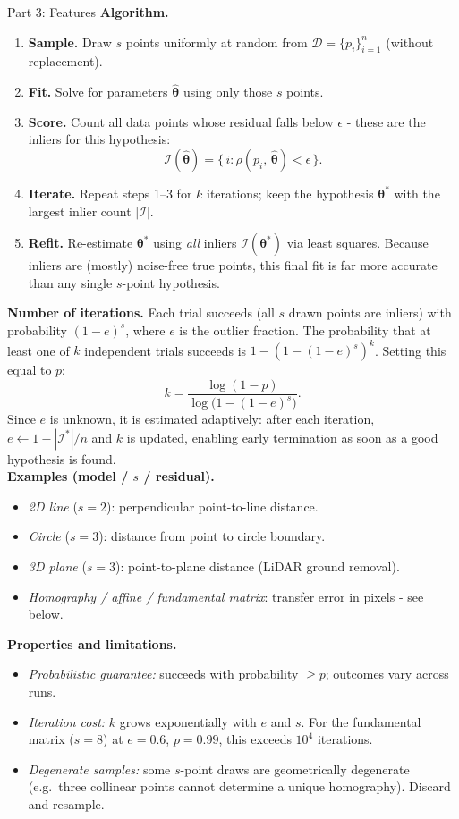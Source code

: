 \documentclass[letterpaper]{article}
\begin{document}
\begin{notes}{Part 3: Features}
\textbf{Algorithm.}
\begin{enumerate}
    \item \textbf{Sample.} Draw $s$ points uniformly at random from $\mathcal{D} = \{p_i\}_{i=1}^n$ (without replacement).
    \item \textbf{Fit.} Solve for parameters $\hat{\boldsymbol{\theta}}$ using only those $s$ points.
    \item \textbf{Score.} Count all data points whose residual falls below $\epsilon$ - these are the inliers for this hypothesis:
    $$\mathcal{I}(\hat{\boldsymbol{\theta}}) = \bigl\{\,i : \rho(p_i,\,\hat{\boldsymbol{\theta}}) < \epsilon\,\bigr\}.$$
    \item \textbf{Iterate.} Repeat steps 1–3 for $k$ iterations; keep the hypothesis $\boldsymbol{\theta}^*$ with the largest inlier count $|\mathcal{I}|$.
    \item \textbf{Refit.} Re-estimate $\boldsymbol{\theta}^*$ using \emph{all} inliers $\mathcal{I}(\boldsymbol{\theta}^*)$ via least squares. Because inliers are (mostly) noise-free true points, this final fit is far more accurate than any single $s$-point hypothesis.
\end{enumerate}

\textbf{Number of iterations.} Each trial succeeds (all $s$ drawn points are inliers) with probability $(1-e)^s$, where $e$ is the outlier fraction. The probability that at least one of $k$ independent trials succeeds is $1-(1-(1-e)^s)^k$. Setting this equal to $p$:
$$k = \frac{\log(1-p)}{\log\bigl(1-(1-e)^s\bigr)}.$$
Since $e$ is unknown, it is estimated adaptively: after each iteration, $e \leftarrow 1 - |\mathcal{I}^*|/n$ and $k$ is updated, enabling early termination as soon as a good hypothesis is found.\\

\textbf{Examples (model / $s$ / residual).}
\begin{itemize}
    \item \emph{2D line} ($s=2$): perpendicular point-to-line distance.
    \item \emph{Circle} ($s=3$): distance from point to circle boundary.
    \item \emph{3D plane} ($s=3$): point-to-plane distance (LiDAR ground removal).
    \item \emph{Homography / affine / fundamental matrix}: transfer error in pixels - see below.
\end{itemize}

\textbf{Properties and limitations.}
\begin{itemize}
    \item \emph{Probabilistic guarantee:} succeeds with probability $\ge p$; outcomes vary across runs.
    \item \emph{Iteration cost:} $k$ grows exponentially with $e$ and $s$. For the fundamental matrix ($s=8$) at $e=0.6$, $p=0.99$, this exceeds $10^4$ iterations.
    \item \emph{Degenerate samples:} some $s$-point draws are geometrically degenerate (e.g.\ three collinear points cannot determine a unique homography). Discard and resample.
\end{itemize}


\end{notes}
\end{document}
